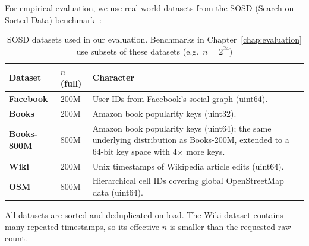 For empirical evaluation, we use real-world datasets from the SOSD (Search on Sorted
Data) benchmark~\citep{kipf2019sosd}:

\begin{table}[H]
    \centering
    \begin{tabular}{@{}llp{}@{}}
        \toprule
        Dataset & $n$ (full) & Character \\
        \midrule
        \textbf{Facebook} & 200M &
        User IDs from Facebook's social graph (uint64). \\
        \textbf{Books} & 200M &
        Amazon book popularity keys (uint32). \\
        \textbf{Books-800M} & 800M &
        Amazon book popularity keys (uint64); the same underlying distribution
        as Books-200M, extended to a 64-bit key space with 4$\times$ more keys. \\
        \textbf{Wiki} & 200M &
        Unix timestamps of Wikipedia article edits (uint64). \\
        \textbf{OSM} & 800M &
        Hierarchical cell IDs covering global OpenStreetMap data (uint64). \\
        \bottomrule
    \end{tabular}
    \caption{SOSD datasets used in our evaluation.
    Benchmarks in Chapter~\ref{chap:evaluation} use
    subsets of these datasets (e.g.\ $n = 2^{24}$)}
    \label{tab:sosd}
\end{table}

\begin{remark}
    All datasets are sorted and deduplicated on load.
    The Wiki dataset contains many repeated timestamps, so its effective $n$
    is smaller than the requested raw count.
\end{remark}

